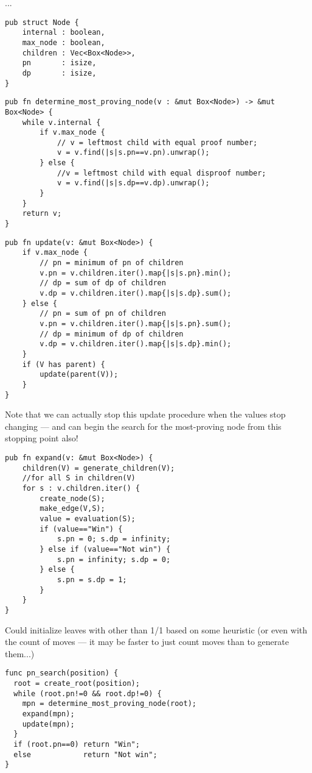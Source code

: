 \documentclass[10pt,dvipdfmx,letterpaper]{report}
\begin{document}
...
{\scriptsize\begin{verbatim}
pub struct Node {
    internal : boolean,
    max_node : boolean,
    children : Vec<Box<Node>>,
    pn       : isize,
    dp       : isize,
}
\end{verbatim}}

{\scriptsize\begin{verbatim}
pub fn determine_most_proving_node(v : &mut Box<Node>) -> &mut Box<Node> {
    while v.internal {
        if v.max_node {
            // v = leftmost child with equal proof number;
            v = v.find(|s|s.pn==v.pn).unwrap();
        } else {
            //v = leftmost child with equal disproof number;
            v = v.find(|s|s.dp==v.dp).unwrap();
        }
    }
    return v;
}
\end{verbatim}}

{\scriptsize\begin{verbatim}
pub fn update(v: &mut Box<Node>) {
    if v.max_node {
        // pn = minimum of pn of children
        v.pn = v.children.iter().map{|s|s.pn}.min();
        // dp = sum of dp of children
        v.dp = v.children.iter().map{|s|s.dp}.sum();
    } else {
        // pn = sum of pn of children
        v.pn = v.children.iter().map{|s|s.pn}.sum();
        // dp = minimum of dp of children
        v.dp = v.children.iter().map{|s|s.dp}.min();
    }
    if (V has parent) {
        update(parent(V));
    }
}
\end{verbatim}}
Note that we can actually stop this update procedure when
the values stop changing --- and can begin the search
for the most-proving node from this stopping point also!

{\scriptsize\begin{verbatim}
pub fn expand(v: &mut Box<Node>) {
    children(V) = generate_children(V);
    //for all S in children(V)
    for s : v.children.iter() {
        create_node(S);
        make_edge(V,S);
        value = evaluation(S);
        if (value=="Win") {
            s.pn = 0; s.dp = infinity;
        } else if (value=="Not win") {
            s.pn = infinity; s.dp = 0;
        } else {
            s.pn = s.dp = 1;
        }
    }
}
\end{verbatim}}
Could initialize leaves with other than 1/1 based on some heuristic
(or even with the count of moves --- it may be faster to just count
moves than to generate them...)

{\scriptsize\begin{verbatim}
func pn_search(position) {
  root = create_root(position);
  while (root.pn!=0 && root.dp!=0) {
    mpn = determine_most_proving_node(root);
    expand(mpn);
    update(mpn);
  }
  if (root.pn==0) return "Win";
  else            return "Not win";
}
\end{verbatim}}
\end{document}
